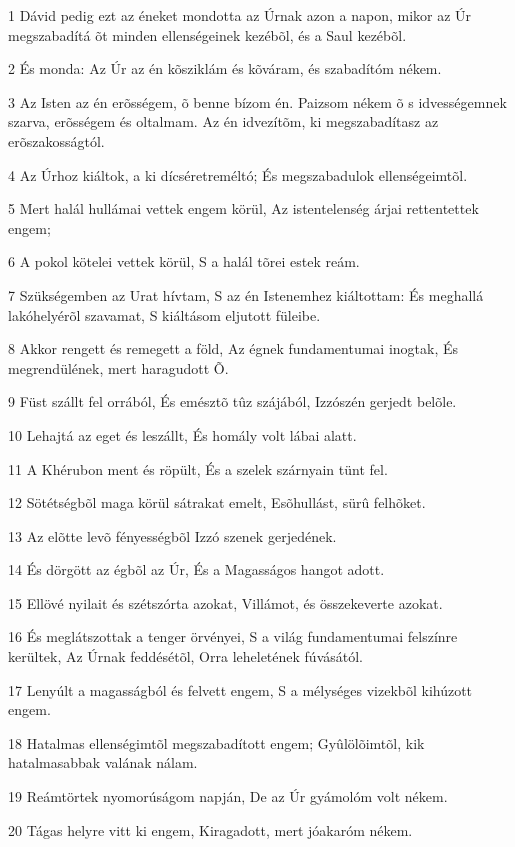 \par 1 Dávid pedig ezt az éneket mondotta az Úrnak azon a napon, mikor az Úr megszabadítá õt minden ellenségeinek kezébõl, és a Saul kezébõl.
\par 2 És monda: Az Úr az én kõsziklám és kõváram, és szabadítóm nékem.
\par 3 Az Isten az én erõsségem, õ benne bízom én. Paizsom nékem õ s idvességemnek szarva, erõsségem és oltalmam. Az én idvezítõm, ki megszabadítasz az erõszakosságtól.
\par 4 Az Úrhoz kiáltok, a ki dícséretreméltó; És megszabadulok ellenségeimtõl.
\par 5 Mert halál hullámai vettek engem körül, Az istentelenség árjai rettentettek engem;
\par 6 A pokol kötelei vettek körül, S a halál tõrei estek reám.
\par 7 Szükségemben az Urat hívtam, S az én Istenemhez kiáltottam: És meghallá lakóhelyérõl szavamat, S kiáltásom eljutott füleibe.
\par 8 Akkor rengett és remegett a föld, Az égnek fundamentumai inogtak, És megrendülének, mert haragudott Õ.
\par 9 Füst szállt fel orrából, És emésztõ tûz szájából, Izzószén gerjedt belõle.
\par 10 Lehajtá az eget és leszállt, És homály volt lábai alatt.
\par 11 A Khérubon ment és röpült, És a szelek szárnyain tünt fel.
\par 12 Sötétségbõl maga körül sátrakat emelt, Esõhullást, sürû felhõket.
\par 13 Az elõtte levõ fényességbõl Izzó szenek gerjedének.
\par 14 És dörgött az égbõl az Úr, És a Magasságos hangot adott.
\par 15 Ellövé nyilait és szétszórta azokat, Villámot, és összekeverte azokat.
\par 16 És meglátszottak a tenger örvényei, S a világ fundamentumai felszínre kerültek, Az Úrnak feddésétõl, Orra leheletének fúvásától.
\par 17 Lenyúlt a magasságból és felvett engem, S a mélységes vizekbõl kihúzott engem.
\par 18 Hatalmas ellenségimtõl megszabadított engem; Gyûlölõimtõl, kik hatalmasabbak valának nálam.
\par 19 Reámtörtek nyomorúságom napján, De az Úr gyámolóm volt nékem.
\par 20 Tágas helyre vitt ki engem, Kiragadott, mert jóakaróm nékem.
